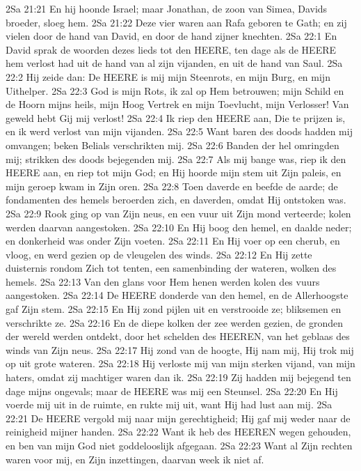 2Sa 21:21  En hij hoonde Israel; maar Jonathan, de zoon van Simea, Davids broeder, sloeg hem.
2Sa 21:22  Deze vier waren aan Rafa geboren te Gath; en zij vielen door de hand van David, en door de hand zijner knechten.
2Sa 22:1  En David sprak de woorden dezes lieds tot den HEERE, ten dage als de HEERE hem verlost had uit de hand van al zijn vijanden, en uit de hand van Saul.
2Sa 22:2  Hij zeide dan: De HEERE is mij mijn Steenrots, en mijn Burg, en mijn Uithelper.
2Sa 22:3  God is mijn Rots, ik zal op Hem betrouwen; mijn Schild en de Hoorn mijns heils, mijn Hoog Vertrek en mijn Toevlucht, mijn Verlosser! Van geweld hebt Gij mij verlost!
2Sa 22:4  Ik riep den HEERE aan, Die te prijzen is, en ik werd verlost van mijn vijanden.
2Sa 22:5  Want baren des doods hadden mij omvangen; beken Belials verschrikten mij.
2Sa 22:6  Banden der hel omringden mij; strikken des doods bejegenden mij.
2Sa 22:7  Als mij bange was, riep ik den HEERE aan, en riep tot mijn God; en Hij hoorde mijn stem uit Zijn paleis, en mijn geroep kwam in Zijn oren.
2Sa 22:8  Toen daverde en beefde de aarde; de fondamenten des hemels beroerden zich, en daverden, omdat Hij ontstoken was.
2Sa 22:9  Rook ging op van Zijn neus, en een vuur uit Zijn mond verteerde; kolen werden daarvan aangestoken.
2Sa 22:10  En Hij boog den hemel, en daalde neder; en donkerheid was onder Zijn voeten.
2Sa 22:11  En Hij voer op een cherub, en vloog, en werd gezien op de vleugelen des winds.
2Sa 22:12  En Hij zette duisternis rondom Zich tot tenten, een samenbinding der wateren, wolken des hemels.
2Sa 22:13  Van den glans voor Hem henen werden kolen des vuurs aangestoken.
2Sa 22:14  De HEERE donderde van den hemel, en de Allerhoogste gaf Zijn stem.
2Sa 22:15  En Hij zond pijlen uit en verstrooide ze; bliksemen en verschrikte ze.
2Sa 22:16  En de diepe kolken der zee werden gezien, de gronden der wereld werden ontdekt, door het schelden des HEEREN, van het geblaas des winds van Zijn neus.
2Sa 22:17  Hij zond van de hoogte, Hij nam mij, Hij trok mij op uit grote wateren.
2Sa 22:18  Hij verloste mij van mijn sterken vijand, van mijn haters, omdat zij machtiger waren dan ik.
2Sa 22:19  Zij hadden mij bejegend ten dage mijns ongevals; maar de HEERE was mij een Steunsel.
2Sa 22:20  En Hij voerde mij uit in de ruimte, en rukte mij uit, want Hij had lust aan mij.
2Sa 22:21  De HEERE vergold mij naar mijn gerechtigheid; Hij gaf mij weder naar de reinigheid mijner handen.
2Sa 22:22  Want ik heb des HEEREN wegen gehouden, en ben van mijn God niet goddelooslijk afgegaan.
2Sa 22:23  Want al Zijn rechten waren voor mij, en Zijn inzettingen, daarvan week ik niet af.
